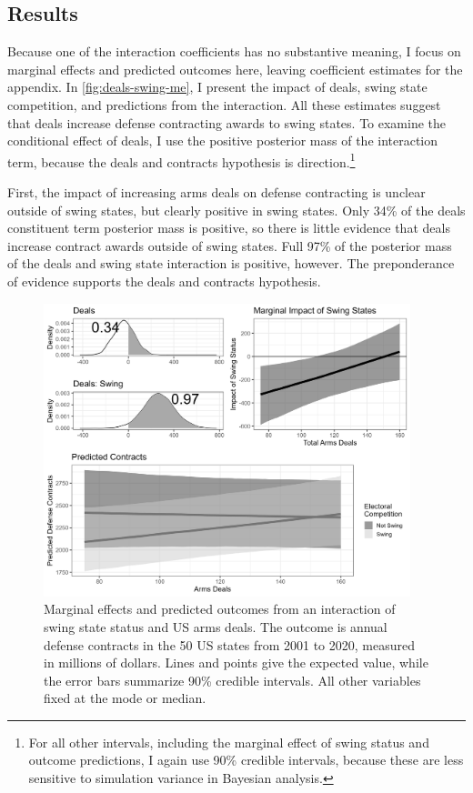 \documentclass[12pt]{article}
\begin{document}
\subsection{Results}


Because one of the interaction coefficients has no substantive meaning, I focus on marginal effects and predicted outcomes here, leaving coefficient estimates for the appendix.
In \autoref{fig:deals-swing-me}, I present the impact of deals, swing state competition, and predictions from the interaction.
All these estimates suggest that deals increase defense contracting awards to swing states. 
To examine the conditional effect of deals, I use the positive posterior mass of the interaction term, because the deals and contracts hypothesis is direction.\footnote{For all other intervals, including the marginal effect of swing status and outcome predictions, I again use 90\% credible intervals, because these are less sensitive to simulation variance in Bayesian analysis.}


First, the impact of increasing arms deals on defense contracting is unclear outside of swing states, but clearly positive in swing states. 
Only 34\% of the deals constituent term posterior mass is positive, so there is little evidence that deals increase contract awards outside of swing states. 
Full 97\% of the posterior mass of the deals and swing state interaction is positive, however. 
The preponderance of evidence supports the deals and contracts hypothesis.


\begin{figure}[htpb]
	\centering
		\includegraphics[width=0.95\textwidth]{../figures/deals-swing-me.png}
	\caption{Marginal effects and predicted outcomes from an interaction of swing state status and US arms deals. The outcome is annual defense contracts in the 50 US states from 2001 to 2020, measured in millions of dollars. Lines and points give the expected value, while the error bars summarize 90\% credible intervals. All other variables fixed at the mode or median.}
	\label{fig:deals-swing-me}
\end{figure}
\end{document}
